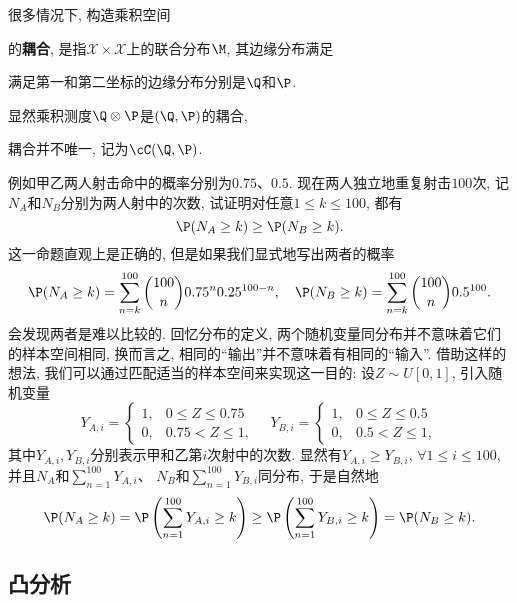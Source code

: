 很多情况下, 构造乘积空间

的\textbf{耦合}, 是指$\mathcal{X} \times \mathcal{X}$上的联合分布$\M$, 其边缘分布满足

满足第一和第二坐标的边缘分布分别是$\Q$和$\P$.


显然乘积测度$\Q \otimes \P$是$(\Q, \P)$的耦合, 

耦合并不唯一, 记为$\cC(\Q, \P)$. 

\begin{example}
	例如甲乙两人射击命中的概率分别为$0.75$、$0.5$. 
	现在两人独立地重复射击$100$次, 记$N_A$和$N_B$分别为两人射中的次数, 试证明对任意$1 \leq k \leq 100$, 都有
	\begin{equation*}
		\P(N_A \geq k) \geq \P(N_B \geq k). 
	\end{equation*}
	这一命题直观上是正确的, 但是如果我们显式地写出两者的概率
	\begin{equation*}
		\P(N_A \geq k) = \sum_{n=k}^{100} \binom{100}{n} 0.75^n 0.25^{100 - n}, \quad
		\P(N_B \geq k) = \sum_{n=k}^{100} \binom{100}{n} 0.5^{100}.  
	\end{equation*}
	会发现两者是难以比较的. 
 	回忆分布的定义, 两个随机变量同分布并不意味着它们的样本空间相同, 换而言之, 相同的“输出”并不意味着有相同的“输入”. 
 	借助这样的想法, 我们可以通过匹配适当的样本空间来实现这一目的: 设$Z \sim U[0,1]$, 引入随机变量
 	\begin{equation*}
 		Y_{A,i} = 
 		\begin{cases}
 			1, & 0 \leq Z \leq 0.75 \\ 0, &0.75 < Z \leq 1, 
 		\end{cases}
 		\quad
 		Y_{B,i} = 
 		\begin{cases}
 			1, & 0 \leq Z \leq 0.5 \\ 0, &0.5 < Z \leq 1, 
 		\end{cases}
 	\end{equation*}
 	其中$Y_{A,i}, Y_{B,i}$分别表示甲和乙第$i$次射中的次数. 
 	显然有$Y_{A,i} \geq Y_{B,i}$, $\forall 1 \leq i \leq 100$, 并且$N_A$和$\sum_{n=1}^{100} Y_{A,i}$、 $N_B$和$\sum_{n=1}^{100} Y_{B,i}$同分布, 于是自然地
 	\begin{equation*}
 		\P(N_A \geq k) 
 		= \P\left(\sum_{n=1}^{100} Y_{A,i} \geq k \right)
 		\geq \P\left(\sum_{n=1}^{100} Y_{B,i} \geq k \right) 
 		= \P(N_B \geq k).
 	\end{equation*}
\end{example}


\subsection{凸分析}

